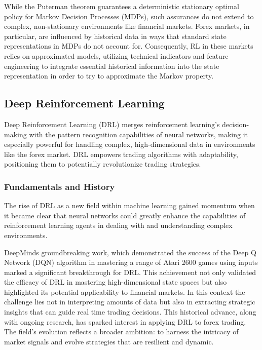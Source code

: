

While the Puterman theorem guarantees a deterministic stationary optimal policy for Markov Decision Processes (MDPs), such assurances do not extend to complex, non-stationary environments like financial markets. Forex markets, in particular, are influenced by historical data in ways that standard state representations in MDPs do not account for. Consequently, RL in these markets relies on approximated models, utilizing technical indicators and feature engineering to integrate essential historical information into the state representation in order to try to approximate the Markov property.

\subsection{Deep Reinforcement Learning}

Deep Reinforcement Learning (DRL) merges reinforcement learning's decision-making with the pattern recognition capabilities of neural networks, making it especially powerful for handling complex, high-dimensional data in environments like the forex market. DRL empowers trading algorithms with adaptability, positioning them to potentially revolutionize trading strategies.

\subsubsection{Fundamentals and History}
The rise of DRL as a new field within machine learning gained momentum when it became clear that neural networks could greatly enhance the capabilities of reinforcement learning agents in dealing with and understanding complex environments.

DeepMinds groundbreaking work, which demonstrated the success of the Deep Q Network (DQN) algorithm in mastering a range of Atari 2600 games using inputs marked a significant breakthrough for DRL. This achievement not only validated the efficacy of DRL in mastering high-dimensional state spaces but also highlighted its potential applicability to financial markets. In this context the challenge lies not in interpreting amounts of data but also in extracting strategic insights that can guide real time trading decisions. This historical advance, along with ongoing research, has sparked interest in applying DRL to forex trading. The field's evolution reflects a broader ambition: to harness the intricacy of market signals and evolve strategies that are resilient and dynamic.

